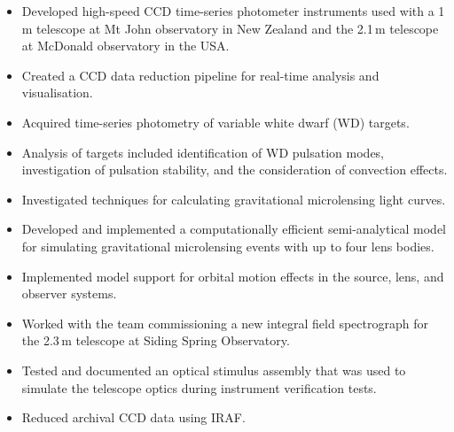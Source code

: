 \documentclass[print]{cv-style}
\begin{document}
\begin{entrylist}
  {
\begin{itemize}
    \item Developed high-speed CCD time-series photometer instruments used with a 1\,m telescope at Mt John observatory in New Zealand and the 2.1\,m telescope at McDonald observatory in the USA.
    \item Created a CCD data reduction pipeline for real-time analysis and visualisation.
    \item Acquired time-series photometry of variable white dwarf (WD) targets.
    \item Analysis of targets included identification of WD pulsation modes, investigation of pulsation stability, and the consideration of convection effects.
\end{itemize}}
  {
\begin{itemize}
    \item Investigated techniques for calculating gravitational microlensing light curves.
    \item Developed and implemented a computationally efficient semi-analytical model for simulating gravitational microlensing events with up to four lens bodies.
    \item Implemented model support for orbital motion effects in the source, lens, and observer systems.
  \end{itemize}}
  {
\begin{itemize}
    \item Worked with the team commissioning a new integral field spectrograph for the 2.3\,m telescope at Siding Spring Observatory.
    \item Tested and documented an optical stimulus assembly that was used to simulate the telescope optics during instrument verification tests.
    \item Reduced archival CCD data using IRAF.
  \end{itemize}}
\end{entrylist}
\end{document}

